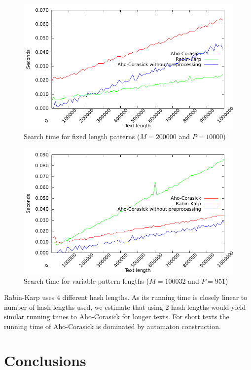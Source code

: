 \documentclass[final]{beamer}
\begin{document}
\begin{poster}
\begin{figure}
\centering
 \includegraphics[width=23cm]{text_len_fixed.pdf}
\caption{
Search time for fixed length patterns ($M = 200000$ and $P = 10000$)
}
\label{fig:text_len_fixed}
\end{figure}

\begin{figure}
\centering
 \includegraphics[width=23cm]{text_len.pdf}
\caption{
Search time for variable pattern lengths ($M = 100032$ and $ P = 951 $)
}
\label{fig:text_len_var}
\end{figure}
\begin{small}
Rabin-Karp uses 4 different hash lengths. As its running time is closely linear to
number of hash lengths used, we estimate that using 2 hash lengths would yield
similar running times to Aho-Corasick for longer texts.
\newline
\newline
For short texts the running time of Aho-Corasick is dominated by automaton construction.
\end{small}
\section{Conclusions}



\end{poster}
\end{document}
